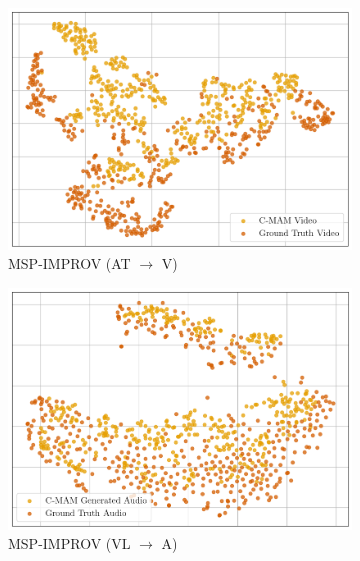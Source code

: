 \begin{figure}[!p]
    \begin{subfigure}[b]{0.24\textwidth}
        \centering
        \includegraphics[width=\textwidth]{imgs/tsne/mmin/msp_improv/cmam_video_tsne_at.png}
        \caption*{MSP-IMPROV (AT $\rightarrow$ V)}
    \end{subfigure}
    \begin{subfigure}[b]{0.24\textwidth}
        \centering
        \includegraphics[width=\textwidth]{imgs/tsne/mmin/msp_improv/cmam_audio_tsne_vt.png}
        \caption*{MSP-IMPROV (VL $\rightarrow$ A)}
    \end{subfigure}
    \begin{subfigure}[b]{0.24\textwidth}
        \centering

\end{subfigure}
\end{figure}
